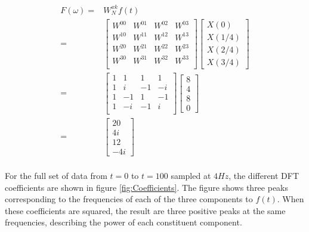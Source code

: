 \message{ !name(Assn2.tex)}\documentclass[twocolumn]{article}
\begin{document}
\begin{equation}
\begin{split}
F(\omega) =& W^{xk}_N f(t) \\
=&\begin{bmatrix}
W^{00} & W^{01} & W^{02} & W^{03} \\
W^{10} & W^{11} & W^{12} & W^{13} \\
W^{20} & W^{21} & W^{22} & W^{23} \\
W^{30} & W^{31} & W^{32} & W^{33} \\
\end{bmatrix} \begin{bmatrix}X(0) \\ X(1/4) \\ X(2/4) \\ X(3/4)\end{bmatrix} \\
=& \begin{bmatrix}
1 & 1 & 1 & 1 \\
1 & i & -1 & -i \\
1 & -1 & 1 & -1 \\
1 & -i & -1 & i \\
\end{bmatrix} \begin{bmatrix}8 \\ 4 \\ 8 \\ 0\end{bmatrix} \\
=& \begin{bmatrix}20 \\ 4i \\ 12 \\ -4i\end{bmatrix} \\
\end{split}
\end{equation}

For the full set of data from $t=0$ to $t=100$ sampled at $4Hz$, the different DFT coefficients are shown in figure \ref{fig:Coefficients}. The figure shows three peaks corresponding to the frequencies of each of the three components to $f(t)$. When these coefficients are squared, the result are three positive peaks at the same frequencies, describing the power of each constituent component.
\end{document}
